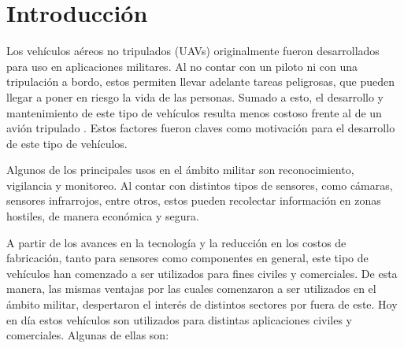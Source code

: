 \section{Introducción}


Los vehículos aéreos no tripulados (UAVs) originalmente fueron desarrollados para uso en aplicaciones militares. Al no contar con un piloto ni con una tripulación a bordo, estos permiten llevar adelante tareas peligrosas, que pueden llegar a poner en riesgo la vida de las personas. Sumado a esto, el desarrollo y mantenimiento de este tipo de vehículos resulta menos costoso frente al de un avión tripulado \cite[p.~490]{collinson2023introduction}. Estos factores fueron claves como motivación para el desarrollo de este tipo de vehículos.

Algunos de los principales usos en el ámbito militar son reconocimiento, vigilancia y monitoreo. Al contar con distintos tipos de sensores, como cámaras, sensores infrarrojos, entre otros, estos pueden recolectar información en zonas hostiles, de manera económica y segura.

A partir de los avances en la tecnología y la reducción en los costos de fabricación, tanto para sensores como componentes en general, este tipo de vehículos han comenzado a ser utilizados para fines civiles y comerciales. De esta manera, las mismas ventajas por las cuales comenzaron a ser utilizados en el ámbito militar, despertaron el interés de distintos sectores por fuera de este. Hoy en día estos vehículos son utilizados para distintas aplicaciones civiles y comerciales. Algunas de ellas son:

